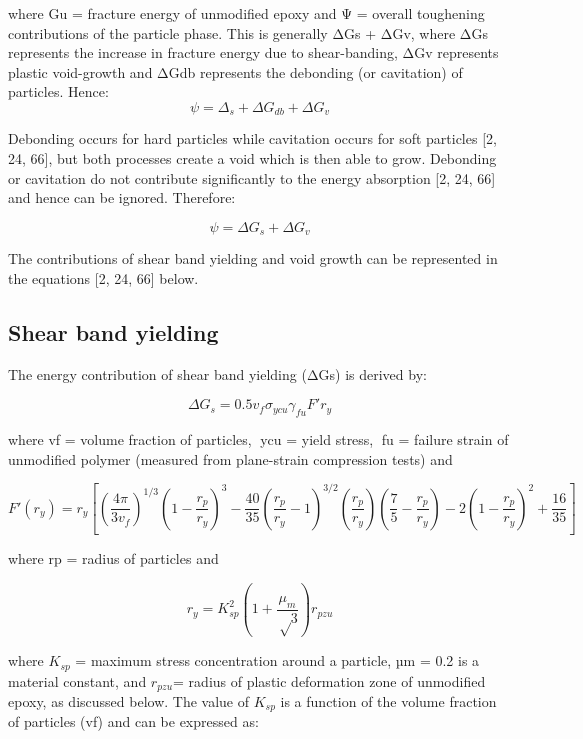 \documentclass[numbers=noendperiod,chapterprefix=on]{icldt} %
\begin{document}
where Gu = fracture energy of unmodified epoxy and Ψ = overall toughening contributions of the particle phase. This is generally ΔGs + ΔGv, where ΔGs represents the increase in fracture energy due to shear-banding, ΔGv represents plastic void-growth and ΔGdb represents the debonding (or cavitation) of particles. Hence:
\begin{equation} 
\psi=\Delta_s+\Delta G_{db}+\Delta G_v
\end{equation}

Debonding occurs for hard particles while cavitation occurs for soft particles [2, 24, 66], but both processes create a void which is then able to grow. Debonding or cavitation do not contribute significantly to the energy absorption [2, 24, 66] and hence can be ignored. Therefore:

\begin{equation} 
\psi=\Delta G_s+\Delta G_v
\end{equation}

The contributions of shear band yielding and void growth can be represented in the equations [2, 24, 66] below. 

\subsection{Shear band yielding}
The energy contribution of shear band yielding (ΔGs) is derived by: 

\begin{equation} 
\Delta G_s=0.5 v_f \sigma_{ycu} \gamma_{fu} F' r_y
\end{equation}

where vf = volume fraction of particles, ycu = yield stress, fu = failure strain of unmodified polymer (measured from plane-strain compression tests) and

\begin{equation} 
F'(r_y)=r_y \left[\left(\frac{4\pi}{3v_f}\right)^{1/3} \left( 1-\frac{r_p}{r_y} \right)^3-
\frac{40}{35} \left( \frac{r_p}{r_y}-1\right) ^{3/2}
(\frac{r_p}{r_y})\left(\frac{7}{5}-\frac{r_p}{r_y}\right) 
-2\left(1- \frac{r_p}{r_y}\right) ^2
+\frac{16}{35}\right]
\end{equation}

where rp = radius of particles and 

\begin{equation} 
r_y= K_{sp}^2 \left( 1+\frac{μ_m}{√3}\right)r_{pzu}
\end{equation}

where $K_{sp}$ = maximum stress concentration around a particle, µm = 0.2 is a material constant, and $r_{pzu}$= radius of plastic deformation zone of unmodified epoxy, as discussed below. The value of $K_{sp}$ is a function of the volume fraction of particles (vf) and can be expressed as:
\end{document}
